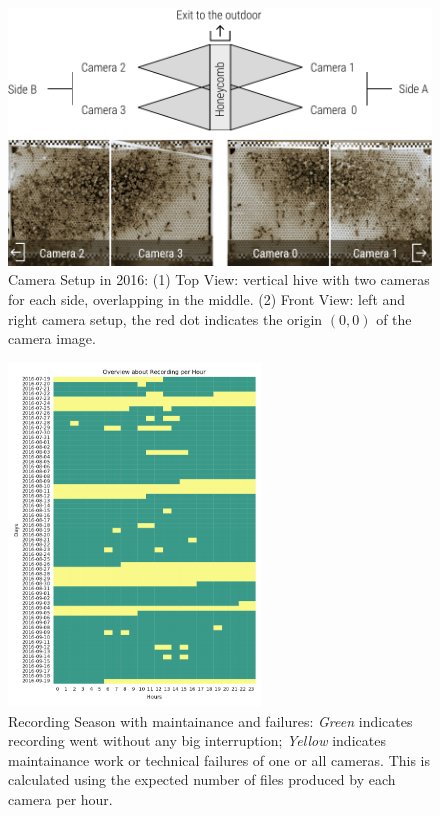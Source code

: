 \begin{figure}[htb]
	\centering
	\includegraphics[width=1.0\textwidth]{Figures/setupCams}
	\caption{Camera Setup in 2016: (1) Top View:  vertical hive with two cameras for each side, overlapping in the middle. (2) Front View: left and right camera setup, the red dot indicates the origin $(0,0)$ of the camera image.}
	\label{fig:cams}
\end{figure}

\begin{figure}[htb]
	\centering
	\includegraphics[width=0.6\textwidth]{Figures/recording}
	\caption[Recording Season]{Recording Season with maintainance and failures: \emph{Green} indicates recording went without any big interruption; \emph{Yellow} indicates maintainance work or technical failures of one or all cameras. This is calculated using the expected number of files produced by each camera per hour.}
	\label{fig:period}
\end{figure}

